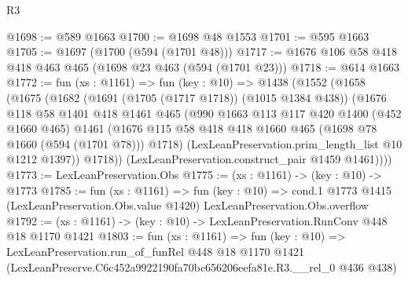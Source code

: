 \begin{lexlean}{R3}
\begin{coremodule}
@1698 := @589 @1663
@1700 := @1698 @48 @1553
@1701 := @595 @1663
@1705 := @1697 (@1700 (@594 (@1701 @48)))
@1717 := @1676 @106 @58 @418 @418 @463 @465 (@1698 @23 @463 (@594 (@1701 @23)))
@1718 := @614 @1663
@1772 := fun (xs : @1161) =>
  fun (key : @10) =>
  @1438
    (@1552
      (@1658
        (@1675
          (@1682
            (@1691 (@1705 (@1717 @1718)) (@1015 @1384 @438))
            (@1676
              @118
              @58
              @1401
              @418
              @1461
              @465
              (@990
                @1663
                @113
                @117
                @420
                @1400
                (@452 @1660 @465)
                @1461
                (@1676 @115 @58 @418 @418 @1660 @465 (@1698 @78 @1660 (@594 (@1701 @78))) @1718)
                (LexLeanPreservation.prim_length_list @10 @1212 @1397))
              @1718))
          (LexLeanPreservation.construct_pair @1459 @1461))))
@1773 := LexLeanPreservation.Obs
@1775 := (xs : @1161) -> (key : @10) -> @1773
@1785 := fun (xs : @1161) =>
  fun (key : @10) =>
  cond.{1} @1773 @1415 (LexLeanPreservation.Obs.value @1420) LexLeanPreservation.Obs.overflow
@1792 := (xs : @1161) -> (key : @10) -> LexLeanPreservation.RunConv @448 @18 @1170 @1421
@1803 := fun (xs : @1161) =>
  fun (key : @10) =>
  LexLeanPreservation.run_of_funRel
    @448
    @18
    @1170
    @1421
    (LexLeanPreserve.C6c452a9922190fa70bc656206eefa81e.R3.__rel_0 @436 @438)
\end{coremodule}
\end{lexlean}
